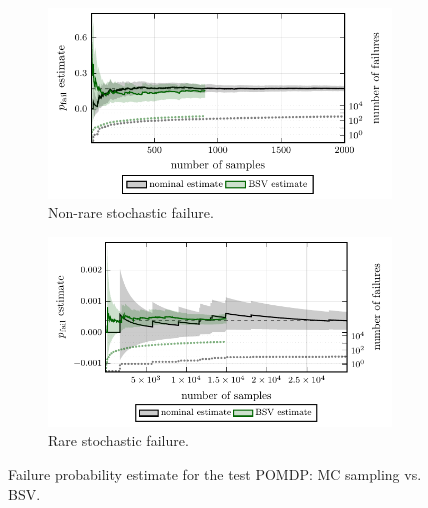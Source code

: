 \begin{figure}[t!]
    \centering
    
    \begin{subfigure}[b]{0.49\textwidth}
        \centering
        \includegraphics[width=\textwidth]{figures/bsv/pomdp/figure-nonrare.pdf}
        \caption{Non-rare stochastic failure.}
        \label{fig:pomdp_nonrare}
    \end{subfigure}
    \hfill
    \begin{subfigure}[b]{0.49\textwidth}
        \centering
        \includegraphics[width=\textwidth]{figures/bsv/pomdp/figure-rare.pdf}
        \caption{Rare stochastic failure.}
        \label{fig:pomdp_rare}
    \end{subfigure}

    \caption{Failure probability estimate for the test POMDP: MC sampling vs. BSV.}
    \label{fig:pomdp}
\end{figure}


